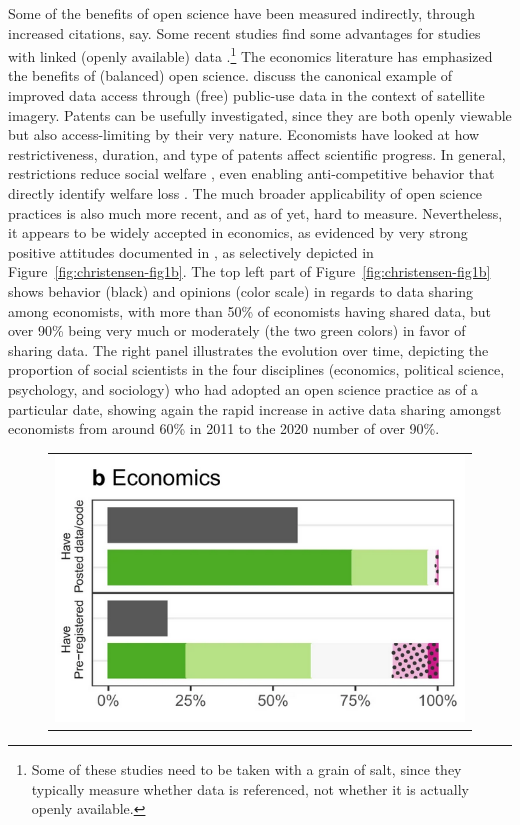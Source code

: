 \documentclass{Revue-economique}
\newcommand{\citep}{\parencite}
\newcommand{\citet}{\textcite}
\begin{document}
\begin{Article} [%
	Titre={Reproducibility and Open Science in Economics},
	Auteur={Lars Vilhuber\thanks{Cornell University, lars.vilhuber@cornell.edu}}]
\begin{refsection}[Main]
Some of the  benefits of open science have  been measured indirectly, through increased citations, say. Some recent studies find some advantages for studies with linked (openly available) data \citep{piwowar_data_2013,colavizza_citation_2020,christensen_study_2019}.\footnote{Some of these studies need to be taken with a grain of salt, since they typically measure whether data is referenced, not whether it is actually openly available.} The economics literature has emphasized the benefits of (balanced) open science. \citet{nagaraj_improving_2020} discuss the canonical example of improved data access through (free) public-use data in the context of satellite imagery. Patents can be usefully investigated, since they are both openly viewable but also access-limiting by their very nature. Economists have looked at how restrictiveness, duration, and type of patents affect scientific progress. In general, restrictions reduce social welfare \citep{williams_intellectual_2013,murray_mice_2016}, even enabling anti-competitive behavior that directly identify welfare loss \citep{xie_anticompetitive_2020}. The much broader applicability of open science practices is also much more recent, and as of yet, hard to measure. Nevertheless, it appears to be widely accepted in economics, as evidenced by very strong positive attitudes documented in \citet{ferguson_survey_2023}, as selectively depicted in  Figure~\ref{fig:christensen-fig1b}. The top left part of Figure~\ref{fig:christensen-fig1b} shows behavior (black) and opinions (color scale) in regards to data sharing among economists, with more than 50\% of economists having shared data, but over 90\% being very much or moderately (the two green colors) in favor of sharing data. The right panel illustrates the evolution over time, depicting the proportion of social scientists in the four disciplines (economics, political science, psychology, and sociology) who had adopted an open science practice as of a particular date, showing again the rapid increase in active data sharing amongst economists from around 60\% in 2011 to the 2020 number of over 90\%.  


\begin{figure}
    \centering
    \begin{tabular}{c}
    \includegraphics[width=0.30\linewidth]{data/christensen-2019-fig1b.png}


\end{tabular}
\end{figure}
\end{refsection}
\end{Article}
\end{document}
